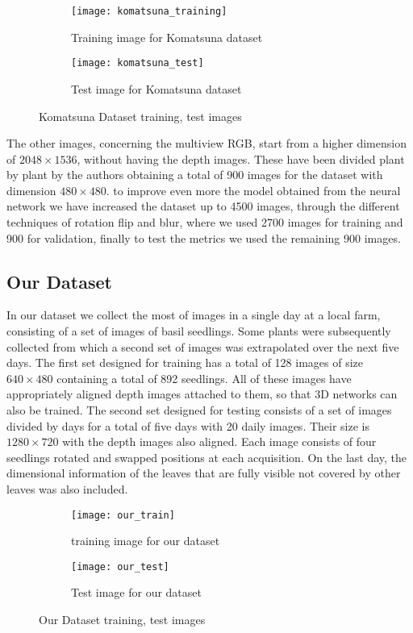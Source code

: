 \begin{figure}[ht] 
  \centering
  \begin{subfigure}{.5\textwidth}
    \centering
    \texttt{[image: komatsuna\_training]}
    \caption{Training image for Komatsuna dataset}
    \label{fig:sub3}
  \end{subfigure}%
  \begin{subfigure}{.5\textwidth}
    \centering
    \texttt{[image: komatsuna\_test]}
    \caption{Test image for Komatsuna dataset}
    \label{fig:sub4}
  \end{subfigure}
  \caption{Komatsuna Dataset training, test images}
  \label{fig:komatsuna}
\end{figure}


The other images, concerning the multiview RGB, start from a higher dimension of $2048\times 1536$, without having the depth images. These have been divided plant by plant by
the authors obtaining a total of 900 images for the dataset with dimension $480\times480$. to improve even more the model obtained from the neural network we have increased
the dataset up to 4500 images, through the different techniques of rotation flip and blur, where we used 2700 images for training and 900 for validation, finally to test
the metrics we used the remaining 900 images.


\subsection{Our Dataset}
In our dataset we collect the most of images in a single day at a local farm, consisting of a set of images of basil seedlings. Some plants were subsequently collected
from which a second set of images was extrapolated over the next five days. The first set designed for training has a total of 128 images of size $640\times 480$
containing a total of 892 seedlings. All of these images have appropriately aligned depth images attached to them, so that 3D networks can also be trained. The second
set designed for testing consists of a set of images divided by days for a total of five days with 20 daily images. Their size is $1280\times 720$ with the depth images also
aligned. Each image consists of four seedlings rotated and swapped positions at each acquisition. On the last day, the dimensional information of the leaves that are
fully visible not covered by other leaves was also included.

\begin{figure}[ht] 
  \centering
  \begin{subfigure}{.5\textwidth}
    \centering
    \texttt{[image: our\_train]}
    \caption{training image for our dataset}
    \label{fig:sub5}
  \end{subfigure}%
  \begin{subfigure}{.5\textwidth}
    \centering
    \texttt{[image: our\_test]}
    \caption{Test image for our dataset}
    \label{fig:sub6}
  \end{subfigure}
  \caption{Our Dataset training, test images}
  \label{fig:ourData}
\end{figure}

